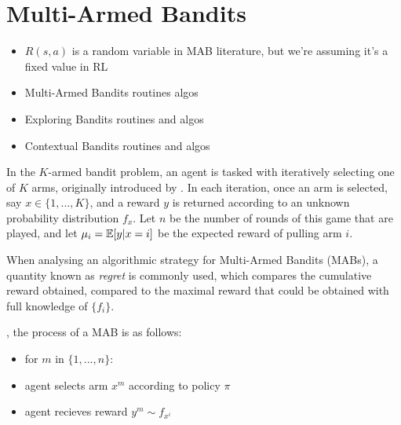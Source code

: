 \section{Multi-Armed Bandits}
\label{sec:2-1-mab}

    \begin{itemize}
        \item $R(s,a)$ is a random variable in MAB literature, but we're assuming it's a fixed value in RL
        \item Multi-Armed Bandits routines algos
        \item Exploring Bandits routines and algos
        \item Contextual Bandits routines and algos
    \end{itemize}


    In the $K$-armed bandit problem, an agent is tasked with iteratively selecting one of $K$ arms, originally introduced by  . In each iteration, once an arm is selected, say $x\in\{1,...,K\}$, and a reward $y$ is returned according to an unknown probability distribution $f_x$. Let $n$ be the number of rounds of this game that are played, and let $\mu_i=\mathbb{E}[y|x=i]$ be the expected reward of pulling arm $i$. 
    
    When analysing an algorithmic strategy for Multi-Armed Bandits (MABs), a quantity known as \textit{regret} is commonly used, which compares the cumulative reward obtained, compared to the maximal reward that could be obtained with full knowledge of $\{f_i\}$.


    , the process of a MAB is as follows:
    \begin{itemize}
        \item for $m$ in $\{1,...,n\}$:
        \item agent selects arm $x^m$ according to policy $\pi$
        \item agent recieves reward $y^m \sim f_{x^i}$
    \end{itemize}

